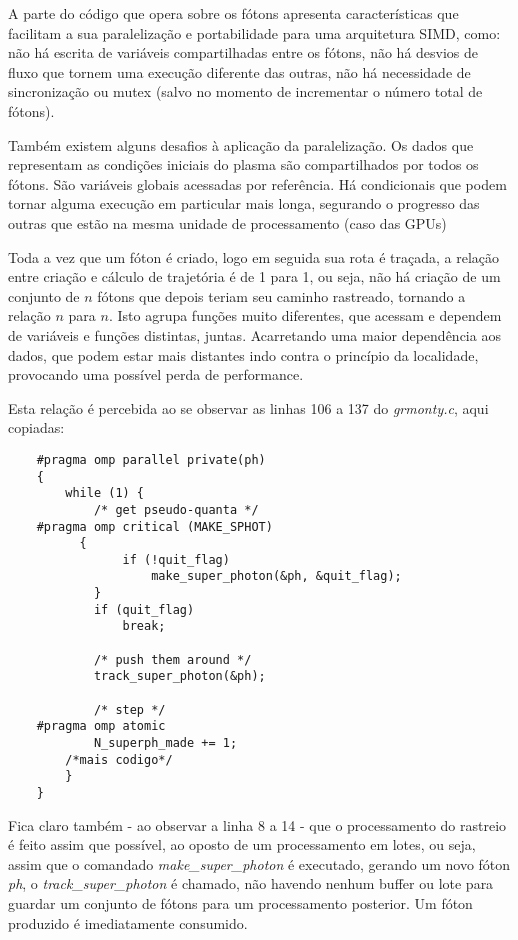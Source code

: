   A parte do código que opera sobre os fótons apresenta características que facilitam a sua paralelização e portabilidade para uma arquitetura SIMD, como: não há escrita de variáveis compartilhadas entre os fótons, não há desvios de fluxo que tornem uma execução diferente das outras, não há necessidade de sincronização ou mutex (salvo no momento de incrementar o número total de fótons).
  
  Também existem alguns desafios à aplicação da paralelização. Os dados que representam as condições iniciais do plasma são compartilhados por todos os fótons. São variáveis globais acessadas por referência. Há condicionais que podem tornar alguma execução em particular mais longa, segurando o progresso das outras que estão na mesma unidade de processamento (caso das GPUs)

  Toda a vez que um fóton é criado, logo em seguida sua rota é traçada, a relação entre criação e cálculo de trajetória é de 1 para 1, ou seja, não há criação de um conjunto de $n$ fótons que depois teriam seu caminho rastreado, tornando a relação $n$ para $n$. Isto agrupa funções muito diferentes, que acessam e dependem de variáveis e funções distintas, juntas. Acarretando uma maior dependência aos dados, que podem estar mais distantes indo contra o princípio da localidade, provocando uma possível perda de performance.
  
  Esta relação é percebida ao se observar as linhas 106 a 137 do \textit{grmonty.c}, aqui copiadas:

  \label{sec:main_loop}
  \begin{lstlisting}
    #pragma omp parallel private(ph)
  	{
  		while (1) {
  			/* get pseudo-quanta */
    #pragma omp critical (MAKE_SPHOT)
  		  {
  				if (!quit_flag)
  					make_super_photon(&ph, &quit_flag);
  			}
  			if (quit_flag)
  				break;

  			/* push them around */
  			track_super_photon(&ph);

  			/* step */
    #pragma omp atomic
  			N_superph_made += 1;
        /*mais codigo*/
  		}
  	}
  \end{lstlisting}

  Fica claro também - ao observar a linha 8 a 14 - que o processamento do rastreio é feito assim que possível, ao oposto de um processamento em lotes, ou seja, assim que o comandado \textit{make\_super\_photon} é executado, gerando um novo fóton \textit{ph}, o  \textit{track\_super\_photon} é chamado, não havendo nenhum buffer ou lote para guardar um conjunto de fótons para um processamento posterior. Um fóton produzido é imediatamente consumido.

